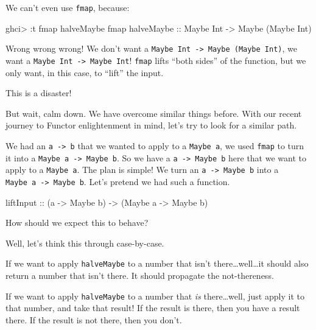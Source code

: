 \documentclass[]{article}
\newenvironment{Shaded}{}{}
\newcommand{\DataTypeTok}[1]{\textcolor[rgb]{0.56,0.13,0.00}{#1}}
\newcommand{\FunctionTok}[1]{\textcolor[rgb]{0.02,0.16,0.49}{#1}}
\newcommand{\NormalTok}[1]{#1}
\newcommand{\OperatorTok}[1]{\textcolor[rgb]{0.40,0.40,0.40}{#1}}
\newcommand{\OtherTok}[1]{\textcolor[rgb]{0.00,0.44,0.13}{#1}}
\begin{document}
We can't even use \texttt{fmap}, because:

\begin{Shaded}
\begin{Highlighting}[]
\NormalTok{ghci}\OperatorTok{\textgreater{}} \OperatorTok{:}\NormalTok{t }\FunctionTok{fmap}\NormalTok{ halveMaybe}
\FunctionTok{fmap}\OtherTok{ halveMaybe ::} \DataTypeTok{Maybe} \DataTypeTok{Int} \OtherTok{{-}\textgreater{}} \DataTypeTok{Maybe}\NormalTok{ (}\DataTypeTok{Maybe} \DataTypeTok{Int}\NormalTok{)}
\end{Highlighting}
\end{Shaded}

Wrong wrong wrong! We don't want a
\texttt{Maybe\ Int\ -\textgreater{}\ Maybe\ (Maybe\ Int)}, we want a
\texttt{Maybe\ Int\ -\textgreater{}\ Maybe\ Int}! \texttt{fmap} lifts ``both
sides'' of the function, but we only want, in this case, to ``lift'' the input.

This is a disaster!

But wait, calm down. We have overcome similar things before. With our recent
journey to Functor enlightenment in mind, let's try to look for a similar path.

We had an \texttt{a\ -\textgreater{}\ b} that we wanted to apply to a
\texttt{Maybe\ a}, we used \texttt{fmap} to turn it into a
\texttt{Maybe\ a\ -\textgreater{}\ Maybe\ b}. So we have a
\texttt{a\ -\textgreater{}\ Maybe\ b} here that we want to apply to a
\texttt{Maybe\ a}. The plan is simple! We turn an
\texttt{a\ -\textgreater{}\ Maybe\ b} into a
\texttt{Maybe\ a\ -\textgreater{}\ Maybe\ b}. Let's pretend we had such a
function.

\begin{Shaded}
\begin{Highlighting}[]
\OtherTok{liftInput ::}\NormalTok{ (a }\OtherTok{{-}\textgreater{}} \DataTypeTok{Maybe}\NormalTok{ b) }\OtherTok{{-}\textgreater{}}\NormalTok{ (}\DataTypeTok{Maybe}\NormalTok{ a }\OtherTok{{-}\textgreater{}} \DataTypeTok{Maybe}\NormalTok{ b)}
\end{Highlighting}
\end{Shaded}

How should we expect this to behave?

Well, let's think this through case-by-case.

If we want to apply \texttt{halveMaybe} to a number that isn't
there\ldots well\ldots it should also return a number that isn't there. It
should propagate the not-thereness.

If we want to apply \texttt{halveMaybe} to a number that \emph{is}
there\ldots well, just apply it to that number, and take that result! If the
result is there, then you have a result there. If the result is not there, then
you don't.
\end{document}
